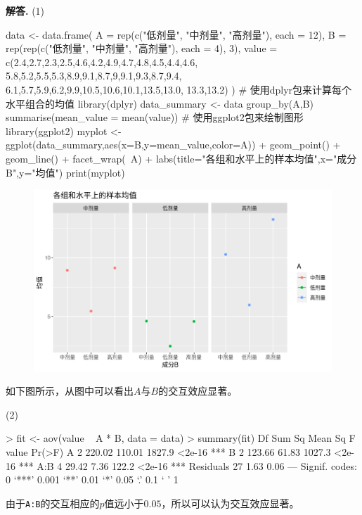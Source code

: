 \documentclass[12pt, a4paper, oneside]{ctexart}
\newenvironment{solution}[1][]{\par\noindent\textbf{#1解答. }}{\smallskip\par}  %
\begin{document}
\begin{solution}
    (1)\begin{rcode}
data <- data.frame(
    A = rep(c("低剂量", "中剂量", "高剂量"), each = 12),
    B = rep(rep(c("低剂量", "中剂量", "高剂量"), each = 4), 3),
    value = c(2.4,2.7,2.3,2.5,4.6,4.2,4.9,4.7,4.8,4.5,4.4,4.6,
                5.8,5.2,5.5,5.3,8.9,9.1,8.7,9,9.1,9.3,8.7,9.4,
                6.1,5.7,5.9,6.2,9.9,10.5,10.6,10.1,13.5,13.0,
                13.3,13.2)
    )
# 使用dplyr包来计算每个水平组合的均值 
library(dplyr)
data_summary <- data %
group_by(A,B) %
summarise(mean_value = mean(value))
# 使用ggplot2包来绘制图形
library(ggplot2)
myplot <- ggplot(data_summary,aes(x=B,y=mean_value,color=A)) +
geom_point() +
geom_line() +
facet_wrap(~A) +
labs(title="各组和水平上的样本均值",x="成分B",y="均值")
print(myplot)
    \end{rcode}
\begin{figure}[htbp]
    \centering
    \includegraphics[scale=0.8]{3.7.png}
\end{figure}
如下图所示，从图中可以看出$A$与$B$的交互效应显著。

    (2)\begin{rcode}
> fit <- aov(value ~ A * B, data = data)
> summary(fit)
            Df Sum Sq Mean Sq F value Pr(>F)    
A            2 220.02  110.01  1827.9 <2e-16 ***
B            2 123.66   61.83  1027.3 <2e-16 ***
A:B          4  29.42    7.36   122.2 <2e-16 ***
Residuals   27   1.63    0.06                   
---
Signif. codes:  0 ‘***’ 0.001 ‘**’ 0.01 ‘*’ 0.05 ‘.’ 0.1 ‘ ’ 1 
    \end{rcode}
    由于\texttt{A:B}的交互相应的$p$值远小于$0.05$，所以可以认为交互效应显著。


\end{solution}
\end{document}
